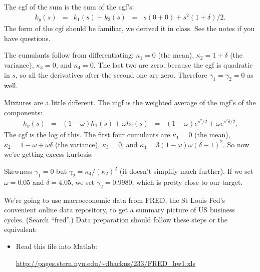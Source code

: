 \documentclass[11pt]{exam}
\begin{document}
\begin{questions}
\begin{solution}
\begin{parts}
\item The cgf of the sum is the sum of the cgf's:
\begin{eqnarray*}
     k_y(s) &=& k_1(s) + k_2(s)
        \;\;=\;\; s (0 + 0) + s^2 (1 + \delta)/2 .
\end{eqnarray*}
The form of the cgf should be familiar, we derived it in class.
See the notes if you have questions.

The cumulants follow from differentiating:
$\kappa_1 = 0 $ (the mean),
$\kappa_2 = 1 + \delta $ (the variance),
$\kappa_3 = 0$,
and $\kappa_4 = 0$.
The last two are zero, because the cgf is quadratic in $s$,
so all the derivatives after the second one are zero.
Therefore $\gamma_1 = \gamma_2 = 0$ as well.

\item Mixtures are a little different.
The mgf is the weighted average of the mgf's of the components:
\begin{eqnarray*}
    h_y(s) &=& (1-\omega)h_1(s)  + \omega h_2(s)
        \;\;=\;\; (1-\omega)e^{s^2/2} + \omega e^{s^2 \delta/2} .
\end{eqnarray*}
The cgf is the log of this.
The first four cumulants are
$\kappa_1 = 0 $ (the mean),
$\kappa_2 = 1-\omega  + \omega \delta $ (the variance),
$\kappa_3 = 0$,
and $\kappa_4 = 3 (1-\omega) \omega (\delta-1)^2$.
So now we're getting excess kurtosis.

\item Skewness $\gamma_1 = 0$ but $\gamma_2 = \kappa_4/(\kappa_2)^2$
(it doesn't simplify much further).
If we set $\omega = 0.05$ and $\delta = 4.05$, we set $\gamma_2 = 0.9980$,
which is pretty close to our target.
\end{parts}
\end{solution}

We're going to use macroeconomic data from FRED,
the St Louis Fed's convenient online data repository,
to get a summary picture of US business cycles.
(Search ``fred''.)
%
Data preparation should follow these steps or the equivalent:
\begin{itemize}
\item Read this file into Matlab:

\vspace*{\parskip}
\centerline{\url{http://pages.stern.nyu.edu/~dbackus/233/FRED_hw1.xls}}


\end{itemize}
\end{questions}
\end{document}
